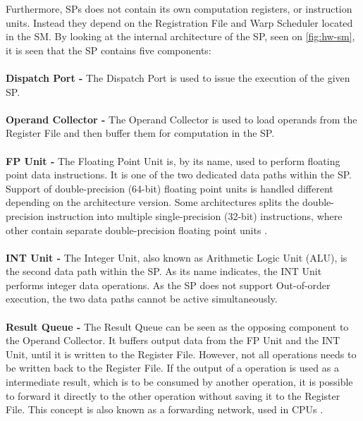 Furthermore, SPs does not contain its own computation registers, or instruction units.
Instead they depend on the Registration File and Warp Scheduler located in the SM.
By looking at the internal architecture of the SP, seen on \cref{fig:hw-sm}, it is seen that the SP contains five components:
\\\\
\textbf{Dispatch Port -} The Dispatch Port is used to issue the execution of the given SP.
\\\\
\textbf{Operand Collector -} The Operand Collector is used to load operands from the Register File and then buffer them for computation in the SP.
\\\\	
\textbf{FP Unit -} The Floating Point Unit is, by its name, used to perform floating point data instructions.
It is one of the two dedicated data paths within the SP.
Support of double-precision (64-bit) floating point units is handled different depending on the architecture version.
Some architectures splits the double-precision instruction into multiple single-precision (32-bit) instructions, where other contain separate double-precision floating point units \cite{Johansson2010}.
\\\\	
\textbf{INT Unit -} The Integer Unit, also known as Arithmetic Logic Unit (ALU), is the second data path within the SP. 
As its name indicates, the INT Unit performs integer data operations.
As the SP does not support Out-of-order execution, the two data paths cannot be active simultaneously.
\\\\	
\textbf{Result Queue -} The Result Queue can be seen as the opposing component to the Operand Collector.
It buffers output data from the FP Unit and the INT Unit, until it is written to the Register File.
However, not all operations needs to be written back to the Register File.
If the output of a operation is used as a intermediate result, which is to be consumed by another operation, it is possible to forward it directly to the other operation without saving it to the Register File.
This concept is also known as a forwarding network, used in CPUs \cite{Kanter2009}.